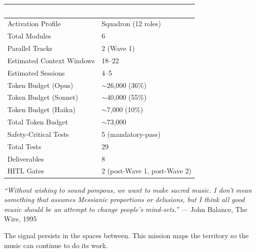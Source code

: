 \documentclass[11pt,letterpaper]{article}
\newcommand{\tableheader}[1]{\textbf{\sffamily\textcolor{white}{#1}}}
\begin{document}
\begin{center}
\begin{tabularx}{\textwidth}{L{5cm}X}
\toprule
{}
\tableheader{Metric} & \tableheader{Value} \\
\midrule
Activation Profile & Squadron (12 roles) \\
Total Modules & 6 \\
Parallel Tracks & 2 (Wave 1) \\
Estimated Context Windows & 18--22 \\
Estimated Sessions & 4--5 \\
Token Budget (Opus) & $\sim$26,000 (36\%) \\
Token Budget (Sonnet) & $\sim$40,000 (55\%) \\
Token Budget (Haiku) & $\sim$7,000 (10\%) \\
Total Token Budget & $\sim$73,000 \\
Safety-Critical Tests & 5 (mandatory-pass) \\
Total Tests & 29 \\
Deliverables & 8 \\
HITL Gates & 2 (post-Wave 1, post-Wave 2) \\
\bottomrule
\end{tabularx}
\end{center}

\vspace{1.5em}

\begin{quotebox}
\textit{``Without wishing to sound pompous, we want to make sacred music. I don't mean something that assumes Messianic proportions or delusions, but I think all good music should be an attempt to change people's mind-sets.''} --- John Balance, The Wire, 1995

\vspace{0.5em}

The signal persists in the spaces between. This mission maps the territory so the music can continue to do its work.
\end{quotebox}
\end{document}
